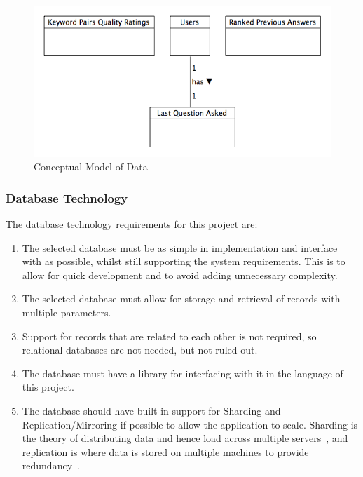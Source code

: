 \documentclass[authoryearcitations]{UoYCSproject}
\begin{document}
\begin{figure}[htb] 
\includegraphics[width=\linewidth]{conceptualModel}
\caption{Conceptual Model of Data}
\label{fig:conceptualDatabaseDesignDiagram}
\end{figure}

\subsubsection{Database Technology}
\label{subsubsec:databaseTechnology}
The database technology requirements for this project are:

\begin{enumerate}
  \item The selected database must be as simple in implementation and interface with as possible, whilst still supporting the system requirements.  This is to allow for quick development and to avoid adding unnecessary complexity.
  \item The selected database must allow for storage and retrieval of records with multiple parameters.
  \item Support for records that are related to each other is not required, so relational databases are not needed, but not ruled out.
  \item The database must have a library for interfacing with it in the language of this project.
  \item The database should have built-in support for Sharding and Replication/Mirroring if possible to allow the application to scale. Sharding is the theory of distributing data and hence load across multiple servers~\cite{aboutSharding}, and replication is where data is stored on multiple machines to provide redundancy~\cite{aboutReplication}.
\end{enumerate}
\end{document}
